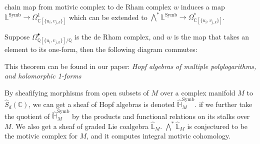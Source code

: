 \documentclass[8pt]{beamer}
\DeclareMathOperator{\Symb}{Symb}
\theoremstyle{definition}
\theoremstyle{remark}
\begin{document}
\begin{frame}[t]{chain map from motivic complex to de Rham complex}
$w$ induces a map $\mathbb L^{\Symb}\to\Omega^1_{\mathbb C[\{u_i,v_{j,k}\}]}$ which can be extended to $\bigwedge^*\mathbb L^{\Symb}\to\Omega^*_{\mathbb C[\{u_i,v_{j,k}\}]}$.
\begin{theorem}
Suppose $\Omega^\bullet_{\mathbb Q[\{u_i,v_{j,k}\}]/\mathbb Q}$ is the de Rham complex, and $w$ is the map that takes an element to its one-form, then the following diagram commutes:
\begin{center}
\end{center}
\end{theorem}

This theorem can be found in our paper: \textit{Hopf algebras of multiple polylogarithms, and holomorphic 1-forms}
\vspace{10pt}

By sheafifying morphisms from open subsets of $M$ over a complex manifold $M$ to $\widehat S_d(\mathbb C)$, we can get a sheaf of Hopf algebras is denoted $\widehat{\mathbb H}^{\Symb}_M$. if we further take the quotient of $\widehat{\mathbb H}^{\Symb}_M$ by the products and functional relations on its stalks over $M$. We also get a sheaf of graded Lie coalgebra $\widehat{\mathbb L}_M$. $\bigwedge^*\widehat{\mathbb L}_M$ is conjectured to be the motivic complex for $M$, and it computes integral motivic cohomology.
\end{frame}
\end{document}
